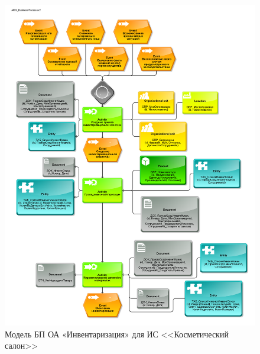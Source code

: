 \begin{figure}[!h]
    \centering

    \includegraphics[width=18cm]
    {assets/ARIS/ARIS_BusinessProcess.adf.pdf}

    \caption{Модель БП ОА «Инвентаризация» для ИС <<Косметический салон>>}

    \label{fig:ARIS_BusinessProcess}
\end{figure}

\newpage
